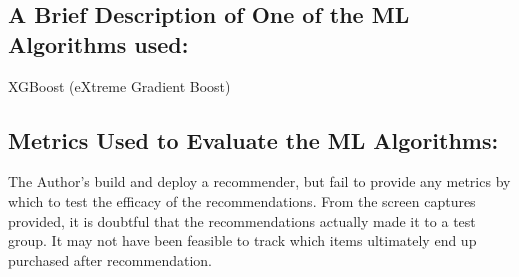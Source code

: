 \documentclass[]{article}
\begin{document}
\subsection*{A Brief Description of One of the ML Algorithms used:}
 XGBoost (eXtreme Gradient Boost)

\subsection*{Metrics Used to Evaluate the ML Algorithms:}
The Author's build and deploy a recommender, but fail to provide any metrics by which to test the efficacy of the recommendations. From the screen captures provided, it is doubtful that the recommendations actually made it to a test group. It may not have been feasible to track which items ultimately end up purchased after recommendation.
\end{document}
